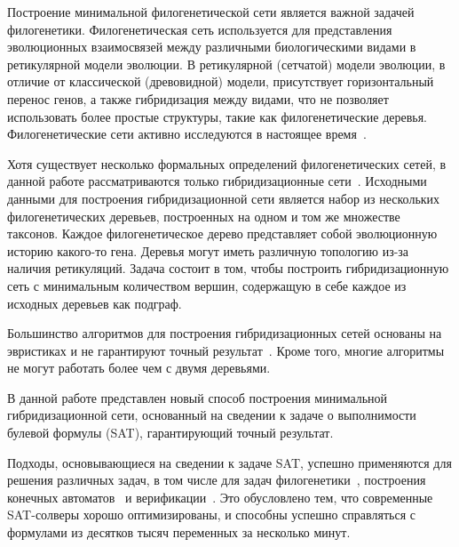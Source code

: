 \startprefacepage

Построение минимальной филогенетической сети является важной задачей филогенетики.
Филогенетическая сеть используется для представления эволюционных взаимосвязей между различными биологическими видами в ретикулярной модели эволюции.
В ретикулярной (сетчатой) модели эволюции, в отличие от классической (древовидной) модели, присутствует горизонтальный перенос генов, а также гибридизация между видами, что не позволяет использовать более простые структуры, такие как филогенетические деревья.
Филогенетические сети активно исследуются в настоящее время~\cite{huson2010phylogenetic, morrison2011introduction, 
nakhleh2011evolutionary}.

Хотя существует несколько формальных определений филогенетических сетей, в данной работе рассматриваются только гибридизационные сети~\cite{semple2006hybridization, chen2010hybridnet}.
Исходными данными для построения гибридизационной сети является набор из нескольких филогенетических деревьев, построенных на одном и том же множестве таксонов.
Каждое филогенетическое дерево представляет собой эволюционную историю какого-то гена.
Деревья могут иметь различную топологию из-за наличия ретикуляций.
Задача состоит в том, чтобы построить гибридизационную сеть с минимальным количеством вершин, содержащую в себе каждое из исходных деревьев как подграф.

Большинство алгоритмов для построения гибридизационных сетей основаны на эвристиках и не гарантируют точный результат~\cite{wu2013algorithm, park2012murpar}.
Кроме того, многие алгоритмы не могут работать более чем с двумя деревьями.

В данной работе представлен новый способ построения минимальной гибридизационной сети, основанный на сведении к задаче о выполнимости булевой формулы (SAT), гарантирующий точный результат.

Подходы, основывающиеся на сведении к задаче SAT, успешно применяются для решения различных задач, в том числе для задач филогенетики~\cite{bonet2009efficiently}, построения конечных автоматов~\cite{heule2010exact} и верификации~\cite{biere2003bounded}.
Это обусловлено тем, что современные SAT-солверы хорошо оптимизированы, и способны успешно справляться с формулами из десятков тысяч переменных за несколько минут.

